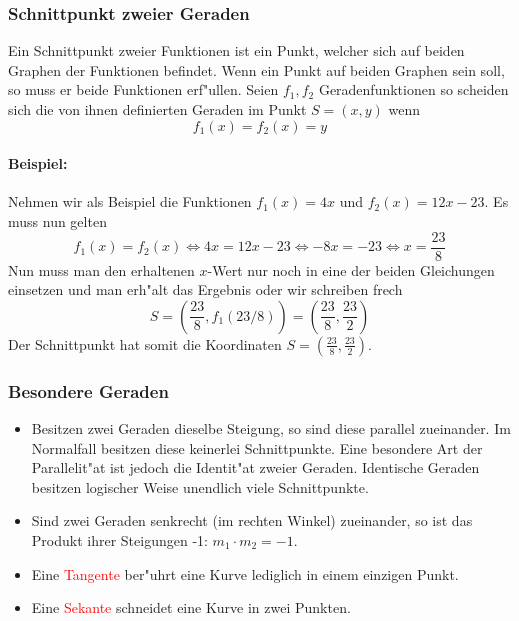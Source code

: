\subsubsection{Schnittpunkt zweier Geraden}
Ein Schnittpunkt zweier Funktionen ist ein Punkt, welcher sich auf beiden Graphen der Funktionen befindet. Wenn ein Punkt auf beiden Graphen sein soll, so muss er beide Funktionen erf"ullen. Seien $f_1, f_2$ Geradenfunktionen so scheiden sich die von ihnen definierten Geraden im Punkt $S = (x, y)$ wenn
\begin{equation*}
f_1(x) = f_2(x) = y
\end{equation*}

\paragraph{Beispiel:}
Nehmen wir als Beispiel die Funktionen $f_1(x) = 4x$ und $f_2(x) = 12x - 23$. Es muss nun gelten 
\begin{equation*}
	f_1(x) = f_2(x) \iff 4x = 12x - 23 \iff -8x = -23 \iff x = \frac{23}{8}
\end{equation*}
Nun muss man den erhaltenen $x$-Wert nur noch in eine der beiden Gleichungen einsetzen und man erh"alt das Ergebnis oder wir schreiben frech
\begin{equation*}
S = \left( \frac{23}{8}, f_1(23/8) \right) = \left(\frac{23}{8}, \frac{23}{2} \right)
\end{equation*}
Der Schnittpunkt hat somit die Koordinaten $S = \left(\frac{23}{8}, \frac{23}{2} \right)$.

\subsubsection{Besondere Geraden}
\begin{itemize}
\item Besitzen zwei Geraden dieselbe Steigung, so sind diese parallel zueinander. Im Normalfall besitzen diese keinerlei Schnittpunkte. Eine besondere Art der Parallelit"at ist jedoch die Identit"at zweier Geraden. Identische Geraden besitzen logischer Weise unendlich viele Schnittpunkte.
\item Sind zwei Geraden senkrecht (im rechten Winkel) zueinander, so ist das Produkt ihrer Steigungen -1: $m_1 \cdot m_2 = -1$.
\item Eine  \textcolor{red}{Tangente} ber"uhrt eine Kurve lediglich in einem einzigen Punkt.
\item Eine  \textcolor{red}{Sekante} schneidet eine Kurve in zwei Punkten.
\end{itemize}